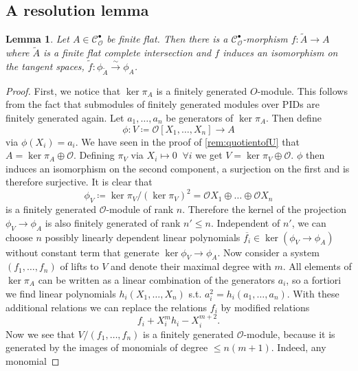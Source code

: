 \documentclass{article}
\theoremstyle{plain}%
\newtheorem{lemma}[theorem]{Lemma}
\theoremstyle{definition}
\theoremstyle{remark}
\newcommand{\cob}{\mathcal{C}_\mathcal{O}^\bullet}
\begin{document}
\subsection{A resolution lemma}

\begin{lemma}\label{lem:resolution}\cite[theorem 5.26]{Darmon1995}
    Let \(A \in \cob\) be finite flat. Then there is a \(\cob\)-morphism \(f\colon \tilde A \to A\) 
    where \(\tilde A\) is a finite flat complete intersection and \(f\) induces an isomorphism on the tangent spaces,
    \(\tilde f \colon \phi_{\tilde{A}} \xrightarrow{\sim} \phi_A\).
\end{lemma}
\begin{proof}
    First, we notice that \(\ker \pi_A\) is a finitely generated \(O\)-module.
    This follows from the fact that submodules of finitely generated modules over PIDs
    are finitely generated again.
    Let \(a_1, \dots, a_n\) be generators of \(\ker \pi_A\). Then define
    \[
        \phi\colon V \coloneqq \mathcal{O}[X_1, \dots, X_n] \to A  
    \]
    via \(\phi(X_i) = a_i\).
    We have seen in the proof of \cref{rem:quotientofU} that \(A = \ker \pi_A \oplus \mathcal{O}\).
    Defining \(\pi_V\) via \(X_i \mapsto 0\;\; \forall i\) we get \(V = \ker \pi_V \oplus \mathcal{O}\).
    \(\phi\) then induces an isomorphism on the second component, a surjection on the first
    and is therefore surjective.
    It is clear that
    \[
        \phi_V \coloneqq \ker \pi_V/(\ker \pi_V)^2 = \mathcal{O}X_1 \oplus \dots \oplus \mathcal{O}X_n
    \] 
    is a finitely generated \(\mathcal{O}\)-module of rank \(n\).
    Therefore the kernel of the projection \(\phi_V \to \phi_A\) is also finitely generated 
    of rank \(n' \leq n\).
    Independent of \(n'\), we can choose \(n\) possibly linearly dependent linear polynomials 
    \(\overline{f_i} \in \ker(\phi_V \to \phi_A)\) without constant term that generate 
    \(\ker \phi_V \to \phi_A\).
    Now consider a system \((f_1, \dots, f_n)\) of lifts to \(V\) and denote their maximal degree with \(m\).
    All elements of \(\ker \pi_A\) can be written as a linear combination of the generators \(a_i\), so a fortiori
    we find linear polynomials \(h_i(X_1, \dots, X_n)\) s.t. \(a_i^2 = h_i(a_1, \dots, a_n)\).
    With these additional relations we can replace the relations \(f_i\) by modified relations
    \[
        f_i + X_i^mh_i - X_i^{m+2}.  
    \]
    Now we see that \(V/(f_1, \dots, f_n)\) is a finitely generated \(\mathcal{O}\)-module, 
    because it is generated by the images of monomials of degree \(\leq n(m+1)\). Indeed, any monomial

\end{proof}
\end{document}
